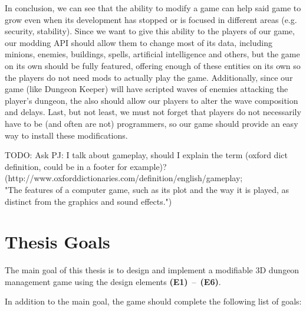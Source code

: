 In conclusion, we can see that the ability to modify a game can help said game to grow even when its development has stopped
or is focused in different areas (e.g. security, stability). Since we want to give this ability to the players of
our game, our modding API should allow them to change most of its data, including minions, enemies, buildings, spells,
artificial intelligence and others, but the game on its own should be fully featured, offering enough of these entities
on its own so the players do not need mods to actually play the game. Additionally, since our game (like Dungeon Keeper)
will have scripted waves of enemies attacking the player's dungeon, the also should allow our players to alter the wave 
composition and delays. Last, but not least, we must not forget that players do not necessarily have to be (and often are not)
programmers, so our game should provide an easy way to install these modifications.

\bigskip
TODO: Ask PJ: I talk about gameplay, should I explain the term (oxford dict definition, could be in a footer for example)?
\\
(http://www.oxforddictionaries.com/definition/english/gameplay; 
\\
"The features of a computer game, such as its plot and the way it is played, as distinct from the graphics and sound effects.")
\bigskip

\section{Thesis Goals}

The main goal of this thesis is to design and implement a modifiable 3D dungeon management game using the design elements \textbf{(E1)}~--~\textbf{(E6)}.

In addition to the main goal, the game should complete the following list of goals:

